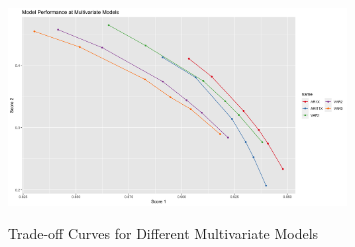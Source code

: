 \documentclass{article}
\begin{document}
\begin{figure}[htbp]
    \caption{Trade-off Curves for Different Multivariate Models}
    \centering
    \includegraphics[width = 0.8\textwidth]{images/ModelPerformanceatMultivariateModels.png}
    \label{fig:fig1.3.6}
\end{figure}
\end{document}
